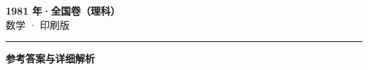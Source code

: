 \documentclass[zihao=5, a4paper]{ctexart}
\begin{document}
\begin{center}
  {\Large\bfseries 1981 年·全国卷（理科）}\\[4pt]
  {\large 数学 · 印刷版}
\end{center}
\medskip
{}

\par\bigskip\hrule\bigskip
{}
\begin{center}{\large\bfseries 参考答案与详细解析}\end{center}
\smallskip

\end{document}

